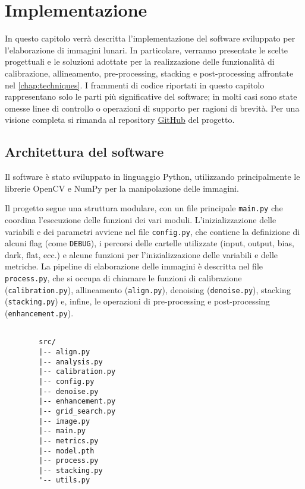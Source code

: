 \chapter{Implementazione} \label{chap:implementation}

In questo capitolo verrà descritta l'implementazione del software sviluppato per l'elaborazione di immagini lunari. In particolare, verranno presentate le scelte progettuali e le soluzioni adottate per la realizzazione delle funzionalità di calibrazione, allineamento, pre-processing, stacking e post-processing affrontate nel \cref{chap:techniques}. I frammenti di codice riportati in questo capitolo rappresentano solo le parti più significative del software; in molti casi sono state omesse linee di controllo o operazioni di supporto per ragioni di brevità. Per una visione completa si rimanda al repository \href{https://github.com/Spina02/Moon-Stacker.git}{GitHub} del progetto.

\section{Architettura del software} \label{sec:architecture}

Il software è stato sviluppato in linguaggio Python, utilizzando principalmente le librerie OpenCV e NumPy per la manipolazione delle immagini.


\begin{multicols}{2}

    Il progetto segue una struttura modulare, con un file principale \texttt{main.py} che coordina l'esecuzione delle funzioni dei vari moduli. L'inizializzazione delle variabili e dei parametri avviene nel file \texttt{config.py}, che contiene la definizione di alcuni flag (come \texttt{DEBUG}), i percorsi delle cartelle utilizzate (input, output, bias, dark, flat, ecc.) e alcune funzioni per l'inizializzazione delle variabili e delle metriche. La pipeline di elaborazione delle immagini è descritta nel file \texttt{process.py}, che si occupa di chiamare le funzioni di calibrazione (\texttt{calibration.py}), allineamento (\texttt{align.py}), denoising (\texttt{denoise.py}), stacking (\texttt{stacking.py}) e, infine, le operazioni di pre-processing e post-processing (\texttt{enhancement.py}).

    \columnbreak

    \begin{verbatim}
         
        src/
        |-- align.py
        |-- analysis.py
        |-- calibration.py
        |-- config.py
        |-- denoise.py
        |-- enhancement.py
        |-- grid_search.py
        |-- image.py
        |-- main.py
        |-- metrics.py
        |-- model.pth
        |-- process.py
        |-- stacking.py
        '-- utils.py
    \end{verbatim}

    \end{multicols}

